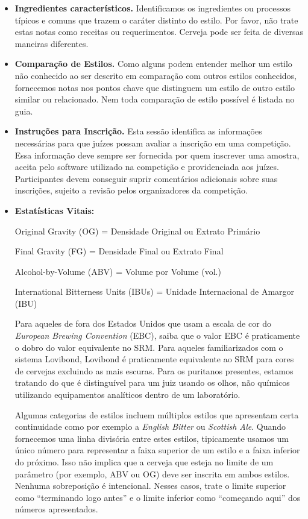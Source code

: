 \begin{itemize}
\item \textbf{Ingredientes característicos.} Identificamos os ingredientes ou processos típicos e comuns que trazem o caráter distinto do estilo. Por favor, não trate estas notas como receitas ou requerimentos. Cerveja pode ser feita de diversas maneiras diferentes.
\item \textbf{Comparação de Estilos.} Como alguns podem entender melhor um estilo não conhecido ao ser descrito em comparação com outros estilos conhecidos, fornecemos notas nos pontos chave que distinguem um estilo de outro estilo similar ou relacionado. Nem toda comparação de estilo possível é listada no guia.
\item \textbf{Instruções para Inscrição.} Esta sessão identifica as informações necessárias para que juízes possam avaliar a inscrição em uma competição. Essa informação deve sempre ser fornecida por quem inscrever uma amostra, aceita pelo software utilizado na competição e providenciada aos juízes. Participantes devem conseguir suprir comentários adicionais sobre suas inscrições, sujeito a revisão pelos organizadores da competição.
\item \textbf{Estatísticas Vitais:}

Original Gravity (OG) = Densidade Original ou Extrato Primário

Final Gravity (FG) = Densidade Final ou Extrato Final

Alcohol-by-Volume (ABV) = Volume por Volume (vol.)

International Bitterness Units (IBUs) = Unidade Internacional de Amargor (IBU)

Para aqueles de fora dos Estados Unidos que usam a escala de cor do \textit{European Brewing Convention} (EBC), saiba que o valor EBC é praticamente o dobro do valor equivalente no SRM. Para aqueles familiarizados com o sistema Lovibond, Lovibond é praticamente equivalente ao SRM para cores de cervejas excluindo as mais escuras. Para os puritanos presentes, estamos tratando do que é distinguível para um juiz usando os olhos, não químicos utilizando equipamentos analíticos dentro de um laboratório.

Algumas categorias de estilos incluem múltiplos estilos que apresentam certa continuidade como por exemplo a \textit{English Bitter} ou \textit{Scottish Ale}. Quando fornecemos uma linha divisória entre estes estilos, tipicamente usamos um único número para representar a faixa superior de um estilo e a faixa inferior do próximo. Isso não implica que a cerveja que esteja no limite de um parâmetro (por exemplo, ABV ou OG) deve ser inscrita em ambos estilos. Nenhuma sobreposição é intencional. Nesses casos, trate o limite superior como “terminando logo antes” e o limite inferior como “começando aqui” dos números apresentados.


\end{itemize}
